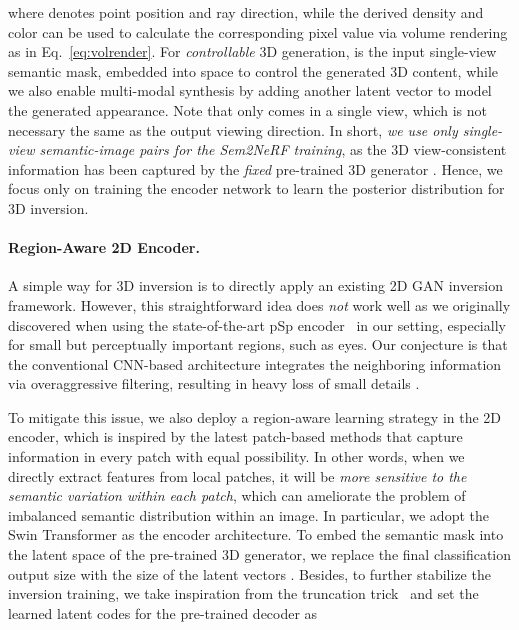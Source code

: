 \documentclass[runningheads]{llncs}
\begin{document}
where  denotes point position and ray direction, while the derived density  and color  can be used to calculate the corresponding pixel value via volume rendering as in Eq.~\eqref{eq:volrender}. For \emph{controllable} 3D generation,  is the input single-view semantic mask, embedded into  space to control the generated 3D content, while we also enable multi-modal synthesis by adding another latent vector  to model the generated appearance. Note that  only comes in a single view, which is not necessary the same as the output viewing direction. In short, \emph{we use only single-view semantic-image pairs  for the Sem2NeRF training}, as the 3D view-consistent information has been captured by the \emph{fixed} pre-trained 3D generator . Hence, we focus only on training the encoder network  to learn the posterior distribution  for 3D inversion.

\paragraph{\textbf{Region-Aware 2D Encoder.}} A simple way for 3D inversion is to directly apply an existing 2D GAN inversion framework. However, this straightforward idea does \emph{not} work well
as we originally discovered when using the state-of-the-art pSp encoder~\cite{richardson2021encoding} in our setting,
especially for small but perceptually important regions, such as eyes. Our conjecture is that the conventional CNN-based architecture integrates the neighboring information via overaggressive filtering, resulting in heavy loss of small details \cite{zhang2019making}. 

To mitigate this issue, we also deploy a region-aware learning strategy in the 2D encoder, which is inspired by the latest patch-based methods \cite{dosovitskiy2020image,zheng2021tfill} that capture information in every patch with equal possibility. In other words, when we directly extract features from local patches, it will be \emph{more sensitive to the semantic variation within each patch}, which can ameliorate the problem of imbalanced semantic distribution within an image. In particular, we adopt the Swin Transformer \cite{liu2021swin} as the encoder architecture. To embed the semantic mask  into the  latent space of the pre-trained 3D generator, we replace the final classification output size with the size of the latent vectors . Besides, 
to further stabilize the inversion training, we take inspiration from the truncation trick~\cite{karras2019style,richardson2021encoding} and set the learned latent codes for the pre-trained decoder as
\end{document}
